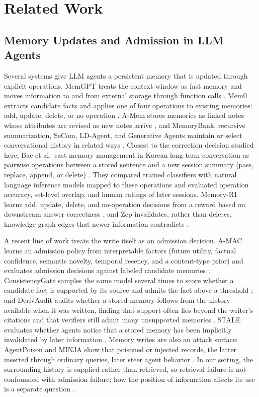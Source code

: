 \documentclass[acmsmall,review,anonymous]{acmart}
\begin{document}
\section{Related Work}\label{sec:related}
\subsection{Memory Updates and Admission in LLM Agents}
Several systems give LLM agents a persistent memory that is updated through explicit operations. MemGPT treats the context window as fast memory and moves information to and from external storage through function calls \cite{cite21}. Mem0 extracts candidate facts and applies one of four operations to existing memories: add, update, delete, or no operation \cite{cite6}. A-Mem stores memories as linked notes whose attributes are revised as new notes arrive \cite{cite39}, and MemoryBank, recursive summarization, SeCom, LD-Agent, and Generative Agents maintain or select conversational history in related ways \cite{cite15,cite22,cite23,cite35,cite47}. Closest to the correction decision studied here, Bae et al.\ cast memory management in Korean long-term conversation as pairwise operations between a stored sentence and a new session summary (pass, replace, append, or delete) \cite{cite4}. They compared trained classifiers with natural language inference models mapped to these operations and evaluated operation accuracy, set-level overlap, and human ratings of later sessions. Memory-R1 learns add, update, delete, and no-operation decisions from a reward based on downstream answer correctness \cite{cite40}, and Zep invalidates, rather than deletes, knowledge-graph edges that newer information contradicts \cite{cite26}.

A recent line of work treats the write itself as an admission decision. A-MAC learns an admission policy from interpretable factors (future utility, factual confidence, semantic novelty, temporal recency, and a content-type prior) and evaluates admission decisions against labeled candidate memories \cite{cite48}; ConsistencyGate samples the same model several times to score whether a candidate fact is supported by its source and admits the fact above a threshold \cite{cite49}; and DerivAudit audits whether a stored memory follows from the history available when it was written, finding that support often lies beyond the writer's citations and that verifiers still admit many unsupported memories \cite{cite51}. STALE evaluates whether agents notice that a stored memory has been implicitly invalidated by later information \cite{cite50}. Memory writes are also an attack surface: AgentPoison and MINJA show that poisoned or injected records, the latter inserted through ordinary queries, later steer agent behavior \cite{cite5,cite7}. In our setting, the surrounding history is supplied rather than retrieved, so retrieval failure is not confounded with admission failure; how the position of information affects its use is a separate question \cite{cite16}.
\end{document}

